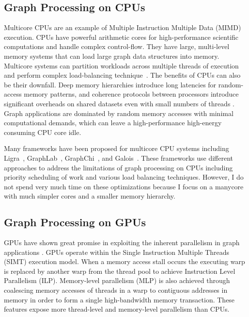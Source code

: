 \subsection{Graph Processing on CPUs} 
Multicore CPUs are an example of Multiple Instruction Multiple Data (MIMD) execution.
CPUs have powerful arithmetic cores for high-performance scientific computations and handle complex control-flow. 
They have large, multi-level memory systems that can load large graph data structures into memory. 
Multicore systems can partition workloads across multiple threads of execution and perform complex load-balancing technique~\cite{myers2012we}.
The benefits of CPUs can also be their downfall. Deep memory hierarchies introduce long latencies for random-access memory patterns, and coherence protocols between processors introduce significant overheads on shared datasets even with small numbers of threads \cite{lumsdaine2007challenges}.
Graph applications are dominated by random memory accesses with minimal computational demands, which can leave a high-performance high-energy consuming CPU core idle.

Many frameworks have been proposed for multicore CPU systems including Ligra~\cite{shun2013ligra}, GraphLab~\cite{low2010graphlab}, GraphChi~\cite{aapo2012graphchi}, and Galois~\cite{nguyen2013lightweight}.
These frameworks use different approaches to address the limitations of graph processing on CPUs including priority scheduling of work and various load balancing techniques.
However, I do not spend very much time on these optimizations because I focus on a manycore with much simpler cores and a smaller memory hierarchy.

\subsection{Graph Processing on GPUs} GPUs have shown great promise in exploiting the inherent parallelism in graph applications \cite{liu2016ibfs, mclaughlin2014bcongpus}.
GPUs operate within the Single Instruction Multiple Threads (SIMT) execution model.
When a memory access stall occurs the executing warp is replaced by another warp from the thread pool to achieve Instruction Level Parallelism (ILP).
Memory-level parallelism (MLP) is also achieved through coalescing memory accesses of threads in a warp to contiguous addresses in memory in order to form a single high-bandwidth memory transaction.
These features expose more thread-level and memory-level parallelism than CPUs. 

